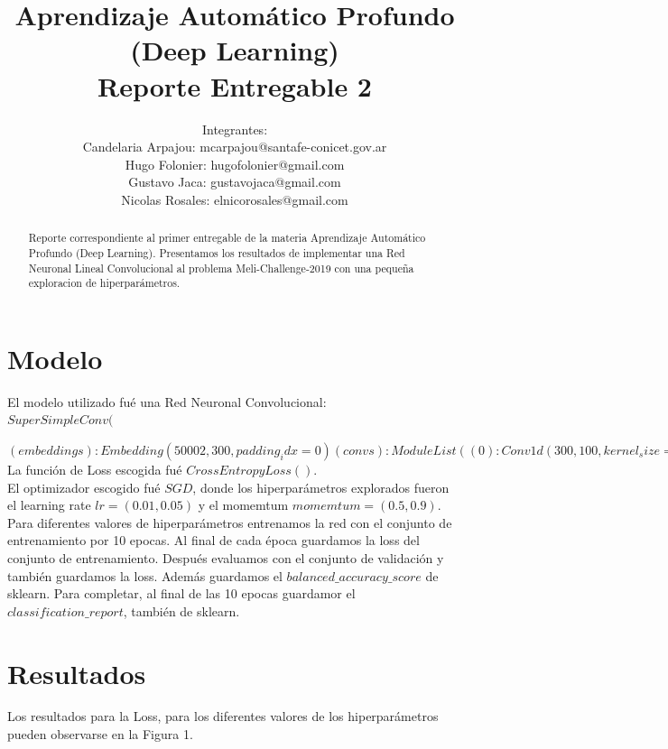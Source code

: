 \documentclass[a4paper,10pt]{article}
\title{\bf{Aprendizaje Automático Profundo\\ 
(Deep Learning)\\
Reporte Entregable 2}}
\author{Integrantes:\\
Candelaria Arpajou: mcarpajou@santafe-conicet.gov.ar\\
Hugo Folonier: hugofolonier@gmail.com\\
Gustavo Jaca: gustavojaca@gmail.com\\
Nicolas Rosales: elnicorosales@gmail.com}
\begin{document}
\maketitle

\begin{abstract}
Reporte correspondiente al primer entregable de la materia Aprendizaje Automático Profundo (Deep Learning). Presentamos los resultados de implementar una Red Neuronal Lineal Convolucional al problema Meli-Challenge-2019 con una pequeña exploracion de hiperparámetros. 
\end{abstract}

\section*{Modelo}

El modelo utilizado fué una Red Neuronal Convolucional:\\

$SuperSimpleConv($

$  (embeddings): Embedding(50002, 300, padding_idx=0)
  (convs): ModuleList(
    (0): Conv1d(300, 100, kernel_size=(2,), stride=(1,))
    (1): Conv1d(300, 100, kernel_size=(3,), stride=(1,))
    (2): Conv1d(300, 100, kernel_size=(4,), stride=(1,))
  )
  (fc): Linear(in_features=300, out_features=1024, bias=True)
  (output_layer): Linear(in_features=1024, out_features=632, bias=True)
)$\\

La función de Loss escogida fué $CrossEntropyLoss()$.\\

El optimizador escogido fué $SGD$, donde los hiperparámetros explorados fueron el learning rate $lr = (0.01, 0.05)$ y el momemtum $momemtum = (0.5, 0.9)$.\\

Para diferentes valores de hiperparámetros entrenamos la red con el conjunto de entrenamiento por 10 epocas. Al final de cada época guardamos la loss del conjunto de entrenamiento. Después evaluamos con el conjunto de validación y también guardamos la loss. Además guardamos el $balanced\_accuracy\_score$ de sklearn. Para completar, al final de las 10 epocas guardamor el $classification\_report$, también de sklearn.

\section*{Resultados}

Los resultados para la Loss, para los diferentes valores de los hiperparámetros pueden observarse en la Figura 1.
\end{document}
